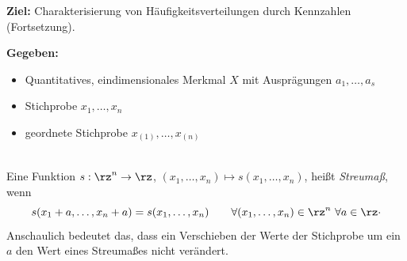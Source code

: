 \noindent \textbf{Ziel:} Charakterisierung von Häufigkeitsverteilungen durch Kennzahlen (Fortsetzung).

\noindent \textbf{Gegeben:}
\begin{itemize}
    \item Quantitatives, eindimensionales \gls{Merkmal} $X$ mit Ausprägungen $a_1,\dots,a_s$
    \item Stichprobe $x_1,\dots,x_n$
    \item geordnete Stichprobe $x_{(1)},\dots,x_{(n)}$
\end{itemize}

\begin{defi}  \\
    Eine Funktion $s:\rz^n\to\rz$, $(x_1,\dots,x_n)\mapsto s(x_1,\dots,x_n)$, heißt \emph{\gls{Streumaß}}, wenn
    \[
        s(x_1+a,\dots,x_n+a) = s(x_1,\dots,x_n) \qquad \forall (x_1,\dots,x_n)\in\rz^n \ \forall a\in\rz \cdot
    \]
    Anschaulich bedeutet das, dass ein Verschieben der Werte der Stichprobe um ein $a$ den Wert eines \gls{Streumaß}es nicht verändert.
\end{defi}

